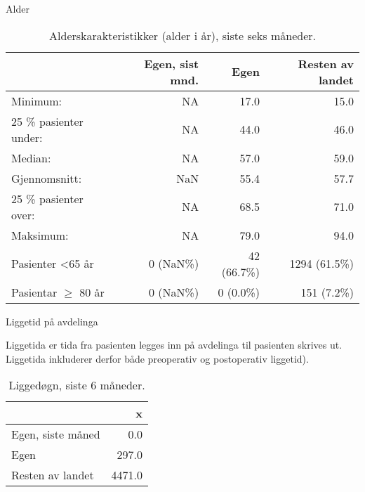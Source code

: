 \documentclass[handout, xcolor=pdftex,dvipsnames,table]{beamer}\usepackage[]{graphicx}\usepackage[]{color}
\makeatletter
\newenvironment{kframe}{%
 \def\at@end@of@kframe{}%
 \ifinner\ifhmode%
  \def\at@end@of@kframe{\end{minipage}}%
  \begin{minipage}{\columnwidth}%
 \fi\fi%
 \def\FrameCommand##1{\hskip\@totalleftmargin \hskip-\fboxsep
 \colorbox{shadecolor}{##1}\hskip-\fboxsep
     \hskip-\linewidth \hskip-\@totalleftmargin \hskip\columnwidth}%
 \MakeFramed {\advance\hsize-\width
   \@totalleftmargin\z@ \linewidth\hsize
   \@setminipage}}%
 {\par\unskip\endMakeFramed%
 \at@end@of@kframe}
\makeatother
\begin{document}
\begin{tiny}
\begin{frame}[fragile] {Alder}
\begin{table}[ht]
\centering
\begin{tabular}{lrrr}
  \hline
 & Egen, sist mnd. & Egen & Resten av landet \\ 
  \hline
Minimum: & NA & 17.0 & 15.0 \\ 
  25 \% pasienter under: & NA & 44.0 & 46.0 \\ 
  Median: & NA & 57.0 & 59.0 \\ 
  Gjennomsnitt: & NaN & 55.4 & 57.7 \\ 
  25 \% pasienter over: & NA & 68.5 & 71.0 \\ 
  Maksimum: & NA & 79.0 & 94.0 \\ 
  Pasienter \textless 65 år & 0 (NaN\%) & 42 (66.7\%) & 1294 (61.5\%) \\ 
  Pasientar $\geq $ 80 år & 0 (NaN\%) & 0 (0.0\%) & 151 (7.2\%) \\ 
   \hline
\end{tabular}
\caption{Alderskarakteristikker (alder i år), siste seks måneder.} 
\label{tab:Alderseigenskapar}
\end{table}


\end{frame}


\begin{frame}[fragile] {Liggetid på avdelinga}
 
Liggetida er tida fra pasienten legges inn på avdelinga til pasienten skrives ut.
Liggetida inkluderer derfor både preoperativ og postoperativ liggetid). 

\begin{kframe}


{\ttfamily\noindent\bfseries\color{errorcolor}{\#\# Error in dimnames(x) <- dn: length of 'dimnames' [2] not equal to array extent}}\end{kframe}%
\begin{table}[ht]
\centering
\begin{tabular}{lr}
  \hline
 & x \\ 
  \hline
Egen, siste måned & 0.0 \\ 
  Egen & 297.0 \\ 
  Resten av landet & 4471.0 \\ 
   \hline
\end{tabular}
\caption{Liggedøgn, siste 6 måneder.} 
\label{tab:liggetidKj}
\end{table}



\end{frame}
\end{tiny}
\end{document}
